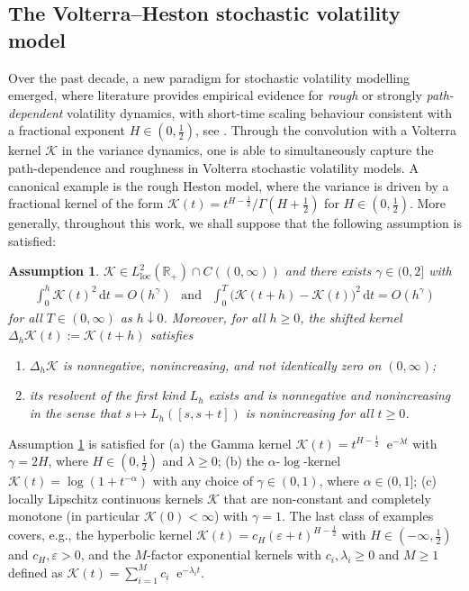 \documentclass[10pt,a4paper,reqno]{amsart}
\newcommand*{\E}{\mathop{} \mathrm{e}}
\newcommand{\R}{\mathbb{R}}
\theoremstyle{plain}
\newtheorem{assumption}[theorem]{Assumption}
\theoremstyle{definition}
\theoremstyle{remark}
\theoremstyle{example}
\begin{document}
\subsection{The Volterra--Heston stochastic volatility model}\label{subsec:volterra-hestonsv}

Over the past decade, a new paradigm for stochastic volatility modelling emerged, where literature provides empirical evidence for \emph{rough} or strongly \emph{path-dependent} volatility dynamics, with short-time scaling behaviour consistent with a fractional exponent $H \in (0,\frac{1}{2})$, see \cite{MR4960404, GatheralJaissonRosenbaum2018, MR4625912}. Through the convolution with a Volterra kernel $\mathcal{K}$ in the variance dynamics, one is able to simultaneously capture the path-dependence and roughness in Volterra stochastic volatility models. A canonical example is the rough Heston model, where the variance is driven by a fractional kernel of the form $\mathcal{K}(t)=t^{H-\frac12}/\Gamma(H+\tfrac12)$ for $H \in (0,\frac{1}{2})$. More generally, throughout this work, we shall suppose that the following assumption is satisfied:

\begin{assumption}\label{assump:K}
$\mathcal{K} \in L_{\mathrm{loc}}^2(\R_+) \cap C((0,\infty))$ and there exists $\gamma \in (0,2]$ with
  \begin{align}\label{eq: K increment condition}
    \int_{0}^{h} \mathcal{K}(t)^2\,\mathrm{d}t = O(h^\gamma) \ \ \text{ and } \ \  \int_{0}^{T} \bigl(\mathcal{K}(t+h) - \mathcal{K}(t)\bigr)^2\,\mathrm{d}t = O(h^\gamma)
  \end{align}
  for all $T \in (0,\infty)$ as $h \downarrow 0$. Moreover, for all $h\geq 0$, the shifted kernel $\Delta_h \mathcal{K}(t):= \mathcal{K}(t+h)$ satisfies
  \begin{enumerate}
    \item[(a)] $\Delta_h \mathcal{K}$ is nonnegative, nonincreasing, and not identically zero on $(0,\infty)$;
    \item[(b)] its resolvent of the first kind $L_h$ exists and is nonnegative and nonincreasing in
the sense that $s\longmapsto L_h([s,s+t])$ is nonincreasing for all $t \geq 0$.
  \end{enumerate}
\end{assumption}

Assumption \ref{assump:K} is satisfied for (a) the Gamma kernel $\mathcal{K}(t) = t^{H - \frac{1}{2}}\E^{-\lambda t}$ with $\gamma = 2H$, where $H \in (0, \frac{1}{2})$ and $\lambda \geq 0$; (b) the $\alpha$-$\log$-kernel $\mathcal{K}(t) = \log(1+t^{-\alpha})$ with any choice of $\gamma \in (0,1)$, where $\alpha \in (0,1]$; (c) locally Lipschitz continuous kernels $\mathcal{K}$ that are non-constant and completely monotone (in particular $\mathcal{K}(0) < \infty$) with $\gamma = 1$. The last class of examples covers, e.g., the hyperbolic kernel $\mathcal{K}(t) = c_H (\varepsilon + t)^{H-\frac{1}{2}}$ with $H \in (-\infty, \frac{1}{2})$ and $c_H, \varepsilon > 0$, and the $M$-factor exponential kernels with $c_i, \lambda_i \geq 0$ and $M \geq 1$ defined as $\mathcal{K}(t) = \sum_{i=1}^M c_i \E^{- \lambda_i t}$.
\end{document}
